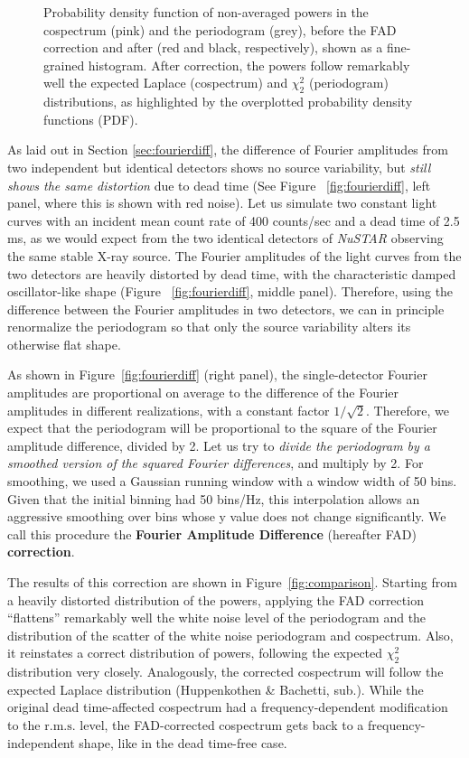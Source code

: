 \documentclass[twocolumn]{aastex61}
\newcommand{\project}[1]{\textsl{#1}}
\newcommand{\nustar}{\project{NuSTAR}\xspace}
\newcommand{\rms}{\ensuremath{\mathrm{r.m.s.}}\xspace}
\begin{document}
\begin{figure*}
\caption{Probability density function of non-averaged powers in the cospectrum (pink) and the periodogram (grey), before the FAD correction and after (red and black, respectively), shown as a fine-grained histogram. 
After correction, the powers follow remarkably well the expected Laplace (cospectrum) and $\chi^2_2$ (periodogram) distributions, as highlighted by the overplotted probability density functions (PDF).}
\label{fig:dist}
\end{figure*}

As laid out in Section \ref{sec:fourierdiff}, the difference of Fourier amplitudes from two independent but identical detectors shows no source variability, but \textit{still shows the same distortion} due to dead time (See Figure ~\ref{fig:fourierdiff}, left panel, where this is shown with red noise).
Let us simulate two constant light curves with an incident mean count rate of 400 counts/sec and a dead time of 2.5 ms, as we would expect from the two identical detectors of \nustar observing the same stable X-ray source.
The Fourier amplitudes of the light curves from the two detectors are heavily distorted by dead time, with the characteristic damped oscillator-like shape \citep{Vikhlinin+94,Zhang+95}  (Figure ~\ref{fig:fourierdiff}, middle panel). 
Therefore, using the difference between the Fourier amplitudes in two detectors, we can in principle renormalize the periodogram so that only the source variability alters its otherwise flat shape.

As shown in Figure~\ref{fig:fourierdiff} (right panel), the single-detector Fourier amplitudes are proportional on average to the difference of the Fourier amplitudes in different realizations, with a constant factor $1/\sqrt{2}$.
Therefore, we expect that the periodogram will be proportional to the square of the Fourier amplitude difference, divided by 2.
Let us try to \textit{divide the periodogram by a smoothed version of the squared Fourier differences}, and multiply by 2.
For smoothing, we used a Gaussian running window with a window width of 50 bins.
Given that the initial binning had 50 bins/Hz, this interpolation allows an aggressive smoothing over bins whose y value does not change significantly.
We call this procedure the \textbf{Fourier Amplitude Difference} (hereafter FAD) \textbf{correction}.

The results of this correction are shown in Figure~\ref{fig:comparison}. 
Starting from a heavily distorted distribution of the powers, applying the FAD correction ``flattens'' remarkably well the white noise level of the periodogram and the distribution of the scatter of the white noise periodogram and cospectrum. 
Also, it reinstates a correct distribution of powers, following the expected $\chi^2_2$ distribution \citep{Lewin+88} very closely. 
Analogously, the corrected cospectrum will follow the expected Laplace distribution (Huppenkothen \& Bachetti, sub.).
While the original dead time-affected cospectrum had a frequency-dependent modification to the \rms level, the FAD-corrected cospectrum gets back to a frequency-independent shape, like in the dead time-free case.
\end{document}
